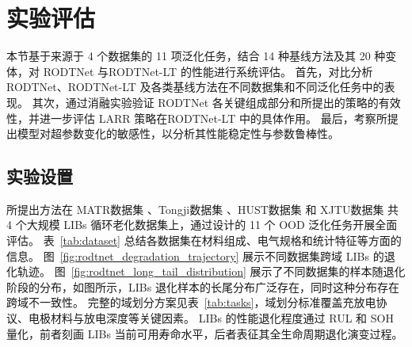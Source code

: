 \section{实验评估}\label{sec:RODTNet_experiment}

本节基于来源于 4 个数据集的 11 项泛化任务，结合 14 种基线方法及其 20 种变体，对 RODTNet 与RODTNet-LT 的性能进行系统评估。
% 
首先，对比分析 RODTNet、RODTNet-LT 及各类基线方法在不同数据集和不同泛化任务中的表现。
% 
其次，通过消融实验验证 RODTNet 各关键组成部分和所提出的策略的有效性，并进一步评估 LARR 策略在RODTNet-LT 中的具体作用。
% 
最后，考察所提出模型对超参数变化的敏感性，以分析其性能稳定性与参数鲁棒性。

\subsection{实验设置}\label{subsec:RODTNet_experimental_setup}

所提出方法在 MATR数据集 \cite{severson2019data, attia2020closed}、Tongji数据集 \cite{zhu2022data}、HUST数据集 \cite{D2EE01676A} 和 XJTU数据集 \cite{wang2024physics} 共 4 个大规模 LIBs 循环老化数据集上，通过设计的 11 个 OOD 泛化任务开展全面评估。
表~\ref{tab:dataset} 总结各数据集在材料组成、电气规格和统计特征等方面的信息。
图~\ref{fig:rodtnet_degradation_trajectory} 展示不同数据集跨域 LIBs 的退化轨迹。
图~\ref{fig:rodtnet_long_tail_distribution} 展示了不同数据集的样本随退化阶段的分布，如图所示，LIBs 退化样本的长尾分布广泛存在，同时这种分布存在跨域不一致性。
完整的域划分方案见表~\ref{tab:tasks}，域划分标准覆盖充放电协议、电极材料与放电深度等关键因素。
LIBs 的性能退化程度通过 RUL 和 SOH 量化，前者刻画 LIBs 当前可用寿命水平，后者表征其全生命周期退化演变过程。

